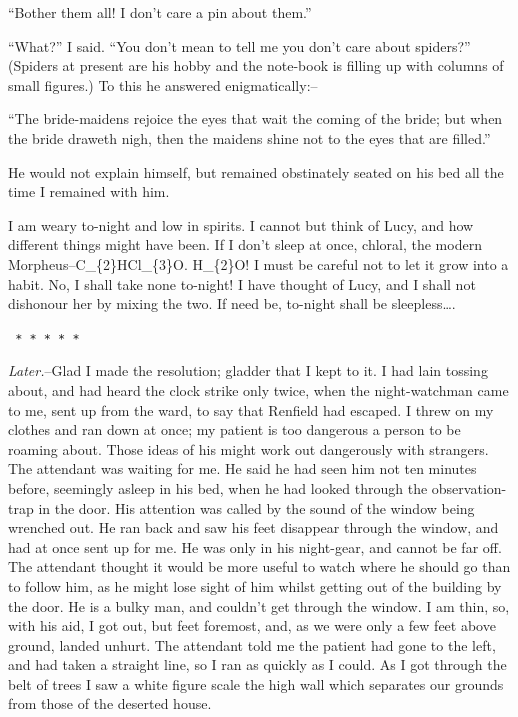 \documentclass[12pt,openright]{book}
\begin{document}
“Bother them all! I don’t care a pin about them.”

“What?” I said. “You don’t mean to tell me you don’t care about spiders?” (Spiders at present are his hobby and the note-book is filling up with columns of small figures.) To this he answered enigmatically:–

“The bride-maidens rejoice the eyes that wait the coming of the bride; but when the bride draweth nigh, then the maidens shine not to the eyes that are filled.”

He would not explain himself, but remained obstinately seated on his bed all the time I remained with him.

I am weary to-night and low in spirits. I cannot but think of Lucy, and how different things might have been. If I don’t sleep at once, chloral, the modern Morpheus–C\_\{2\}HCl\_\{3\}O. H\_\{2\}O! I must be careful not to let it grow into a habit. No, I shall take none to-night! I have thought of Lucy, and I shall not dishonour her by mixing the two. If need be, to-night shall be sleepless….

\texttt{   *       *       *       *       *}

\textit{Later.}–Glad I made the resolution; gladder that I kept to it. I had lain tossing about, and had heard the clock strike only twice, when the night-watchman came to me, sent up from the ward, to say that Renfield had escaped. I threw on my clothes and ran down at once; my patient is too dangerous a person to be roaming about. Those ideas of his might work out dangerously with strangers. The attendant was waiting for me. He said he had seen him not ten minutes before, seemingly asleep in his bed, when he had looked through the observation-trap in the door. His attention was called by the sound of the window being wrenched out. He ran back and saw his feet disappear through the window, and had at once sent up for me. He was only in his night-gear, and cannot be far off. The attendant thought it would be more useful to watch where he should go than to follow him, as he might lose sight of him whilst getting out of the building by the door. He is a bulky man, and couldn’t get through the window. I am thin, so, with his aid, I got out, but feet foremost, and, as we were only a few feet above ground, landed unhurt. The attendant told me the patient had gone to the left, and had taken a straight line, so I ran as quickly as I could. As I got through the belt of trees I saw a white figure scale the high wall which separates our grounds from those of the deserted house.
\end{document}

